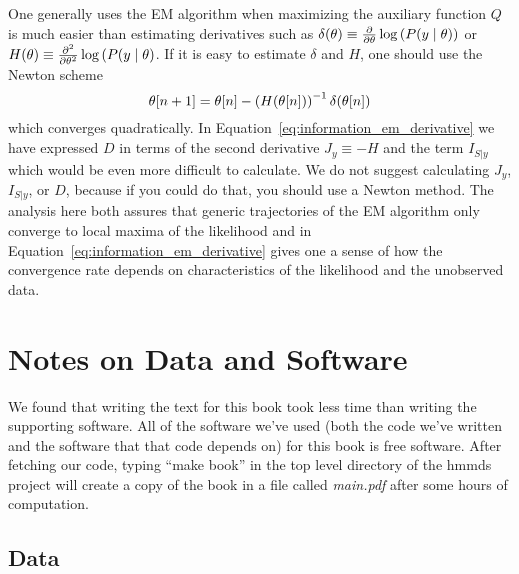 One generally uses the EM algorithm when maximizing the auxiliary
function $Q$ is much easier than estimating derivatives such as
$\delta(\theta) \equiv \frac{\partial}{\partial \theta} \log
\left( P(y \mid \theta )\right)$ or
$H(\theta) \equiv \frac{\partial^2}{\partial \theta^2} \log
\left( P(y \mid \theta \right)$.  If it is easy to estimate
$\delta$ and $H$, one should use the Newton scheme
\begin{equation*}
  {\theta}{[n+1]} = {\theta}{[n]} - \left(H({\theta}{[n]})\right)^{-1} \delta({\theta}{[n]})
\end{equation*}
which converges quadratically.  In
Equation~\eqref{eq:information_em_derivative} we have expressed $D$ in
terms of the second derivative $J_y\equiv -H$ and the term $I_{S|y}$
which would be even more difficult to calculate.  We do not suggest
calculating $J_y$, $I_{S|y}$, or $D$, because if you could do that,
you should use a Newton method.  The analysis here both assures that
generic trajectories of the EM algorithm only converge to local maxima
of the likelihood and in Equation~\eqref{eq:information_em_derivative}
gives one a sense of how the convergence rate depends on
characteristics of the likelihood and the unobserved data.

\chapter{Notes on Data and Software}
\label{cha:Software}

We found that writing the text for this book took less time than
writing the supporting software.  All of the software we've used (both
the code we've written and the software that that code depends on) for
this book is free software.  After fetching our code, typing ``make
book'' in the top level directory of the hmmds project will create a
copy of the book in a file called \emph{main.pdf} after some hours of
computation.  

\section*{Data}


